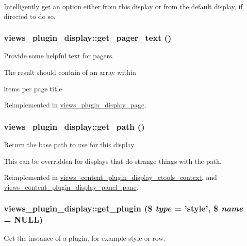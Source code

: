 \label{classviews__plugin__display_ad2a856f65cb78867204d4f7f877b2972}
Intelligently get an option either from this display or from the default display, if directed to do so. \hypertarget{classviews__plugin__display_add6b60160cfdbc8b0ea29a380854057e}{
\subsubsection[{get\_\-pager\_\-text}]{\setlength{\rightskip}{0pt plus 5cm}views\_\-plugin\_\-display::get\_\-pager\_\-text ()}}
\label{classviews__plugin__display_add6b60160cfdbc8b0ea29a380854057e}
Provide some helpful text for pagers.

The result should contain of an array within
\begin{DoxyItemize}
\item items per page title 
\end{DoxyItemize}

Reimplemented in \hyperlink{classviews__plugin__display__page_aca620130dea055b599b405845627f3f0}{views\_\-plugin\_\-display\_\-page}.\hypertarget{classviews__plugin__display_ac9a045f84e31fbe0513482170bd61c01}{
\subsubsection[{get\_\-path}]{\setlength{\rightskip}{0pt plus 5cm}views\_\-plugin\_\-display::get\_\-path ()}}
\label{classviews__plugin__display_ac9a045f84e31fbe0513482170bd61c01}
Return the base path to use for this display.

This can be overridden for displays that do strange things with the path. 

Reimplemented in \hyperlink{classviews__content__plugin__display__ctools__context_ae11e60c8046dcac9210f4c097606a4b7}{views\_\-content\_\-plugin\_\-display\_\-ctools\_\-context}, and \hyperlink{classviews__content__plugin__display__panel__pane_a363668d682a3d3489aef9df3adcbc7b7}{views\_\-content\_\-plugin\_\-display\_\-panel\_\-pane}.\hypertarget{classviews__plugin__display_a7a38d9a80eed86c5c00f7d66002fbf8d}{
\subsubsection[{get\_\-plugin}]{\setlength{\rightskip}{0pt plus 5cm}views\_\-plugin\_\-display::get\_\-plugin (\$ {\em type} = {\ttfamily 'style'}, \/  \$ {\em name} = {\ttfamily NULL})}}
\label{classviews__plugin__display_a7a38d9a80eed86c5c00f7d66002fbf8d}
Get the instance of a plugin, for example style or row.


